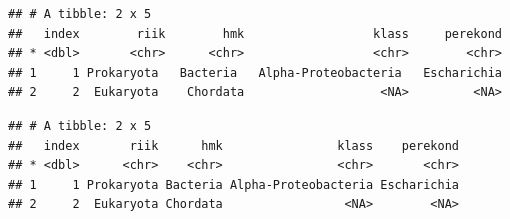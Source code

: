 \documentclass[]{book}
\newenvironment{Shaded}{\begin{snugshade}}{\end{snugshade}}
\newcommand{\KeywordTok}[1]{\textcolor[rgb]{0.13,0.29,0.53}{\textbf{#1}}}
\newcommand{\DataTypeTok}[1]{\textcolor[rgb]{0.13,0.29,0.53}{#1}}
\newcommand{\DecValTok}[1]{\textcolor[rgb]{0.00,0.00,0.81}{#1}}
\newcommand{\CharTok}[1]{\textcolor[rgb]{0.31,0.60,0.02}{#1}}
\newcommand{\StringTok}[1]{\textcolor[rgb]{0.31,0.60,0.02}{#1}}
\newcommand{\OperatorTok}[1]{\textcolor[rgb]{0.81,0.36,0.00}{\textbf{#1}}}
\newcommand{\NormalTok}[1]{#1}
\begin{document}
\begin{Shaded}
\end{Shaded}

\begin{verbatim}
## # A tibble: 2 x 5
##   index        riik        hmk                  klass     perekond
## * <dbl>       <chr>      <chr>                  <chr>        <chr>
## 1     1 Prokaryota   Bacteria   Alpha-Proteobacteria   Escharichia
## 2     2  Eukaryota    Chordata                   <NA>         <NA>
\end{verbatim}

\begin{Shaded}
\end{Shaded}

\begin{verbatim}
## # A tibble: 2 x 5
##   index       riik      hmk                klass    perekond
## * <dbl>      <chr>    <chr>                <chr>       <chr>
## 1     1 Prokaryota Bacteria Alpha-Proteobacteria Escharichia
## 2     2  Eukaryota Chordata                 <NA>        <NA>
\end{verbatim}
\end{document}
